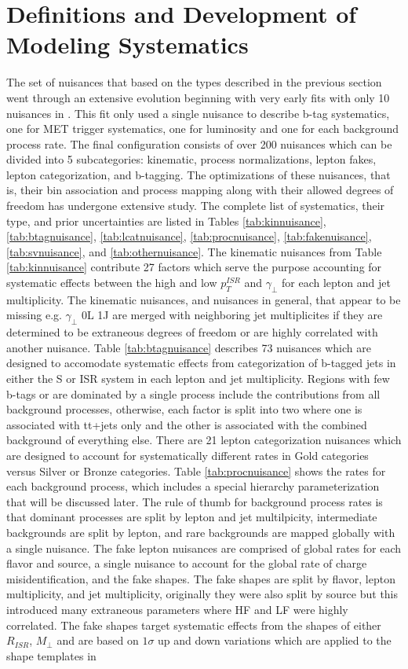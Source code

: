 \section{Definitions and Development of Modeling Systematics}
The set of nuisances that based on the types described in the previous section went through an extensive evolution beginning with very early fits with only 10 nuisances in \cite{erich thesis}. This fit only used a single nuisance to describe b-tag systematics, one for MET trigger systematics, one for luminosity and one for each background process rate. The final configuration consists of over 200 nuisances which can be divided into 5 subcategories: kinematic, process normalizations, lepton fakes, lepton categorization, and b-tagging. The optimizations of these nuisances, that is, their bin association and process mapping along with their allowed degrees of freedom has undergone extensive study. The complete list of systematics, their type, and prior uncertainties are listed in Tables \ref{tab:kinnuisance}, \ref{tab:btagnuisance}, \ref{tab:lcatnuisance}, \ref{tab:procnuisance}, \ref{tab:fakenuisance}, \ref{tab:svnuisance}, and \ref{tab:othernuisance}.  The kinematic nuisances from Table \ref{tab:kinnuisance} contribute 27 factors which serve the purpose accounting for systematic effects between the high and low $p_T^{ISR}$ and $\gamma_\perp$ for each lepton and jet multiplicity. The kinematic nuisances, and nuisances in general, that appear to be missing e.g. $\gamma_\perp$ 0L 1J are merged with neighboring jet multiplicites if they are determined to be extraneous degrees of freedom or are highly correlated with another nuisance. Table \ref{tab:btagnuisance} describes 73 nuisances which are designed to accomodate systematic effects from categorization of b-tagged jets in either the S or ISR system in each lepton and jet multiplicity. Regions with few b-tags or are dominated by a single process include the contributions from all background processes, otherwise, each factor is split into two where one is associated with tt+jets only and the other is associated with the combined background of everything else. There are 21 lepton categorization nuisances which are designed to account for systematically different rates in Gold categories versus Silver or Bronze categories. Table \ref{tab:procnuisance} shows the rates for each background process, which includes a special hierarchy parameterization that will be discussed later. The rule of thumb for background process rates is that dominant processes are split by lepton and jet multilpicity, intermediate backgrounds are split by lepton, and rare backgrounds are mapped globally with a single nuisance. The fake lepton nuisances are comprised of global rates for each flavor and source, a single nuisance to account for the global rate of  charge misidentification, and the fake shapes. The fake shapes are split by flavor, lepton multiplicity, and jet multiplicity, originally they were also split by source but this introduced many extraneous parameters where HF and LF were highly correlated. The fake shapes target systematic effects from the shapes of either $R_{ISR}$, $M_\perp$ and are based on $1\sigma$ up and down variations which are applied to the shape templates in 